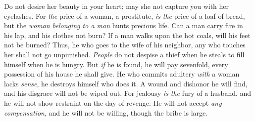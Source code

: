 \begin{biblechapter}
\verse Do not desire her beauty in your heart; 
may she not capture you with her eyelashes.
\verse For \textit{the} price of a woman, a prostitute, \textit{is the} price of a loaf of bread, 
but the \textit{woman belonging to a man} hunts precious life.
 Can a man carry fire in his lap, 
and his clothes not burn?
\verse If a man walks upon the hot coals, 
will his feet not be burned?
\verse Thus, he who goes to the wife of his neighbor, 
any who touches her shall not go unpunished.
\verse \textit{People} do not despise a thief when he steals 
to fill himself when he is hungry.
\verse But \textit{if} he is found, he will pay sevenfold, 
every possession of his house he shall give.
\verse He who commits adultery \textit{with} a woman lacks \textit{sense}, 
he destroys himself who does it.
\verse A wound and dishonor he will find, 
and his disgrace will not be wiped out.
\verse For jealousy \textit{is the} fury of a husband, 
and he will not show restraint on the day of revenge.
\verse He will not accept \textit{any compensation}, 
and he will not be willing, though the bribe is large.
\end{biblechapter}

